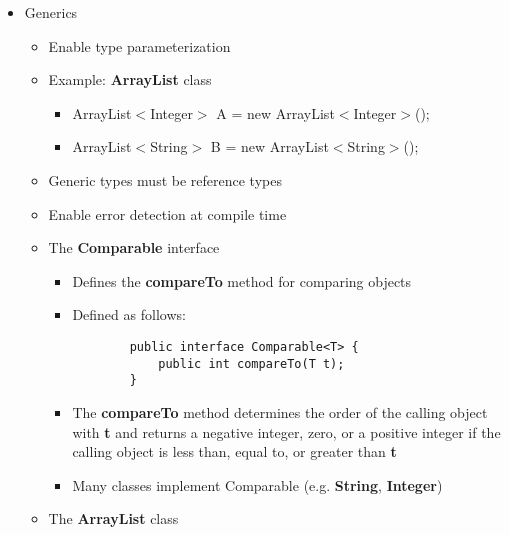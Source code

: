 \begin{itemize}
	\item Generics
	\begin{itemize}
		\item Enable type parameterization
		\item Example: \textbf{ArrayList} class
		\begin{itemize}
			\item ArrayList$<$Integer$>$ A = new ArrayList$<$Integer$>$();
			\item ArrayList$<$String$>$ B = new ArrayList$<$String$>$();
		\end{itemize}
		\item Generic types must be reference types
		\item Enable error detection at compile time
		\item The \textbf{Comparable} interface
		\begin{itemize}
			\item Defines the \textbf{compareTo} method for comparing objects
			\item Defined as follows:\begin{Verbatim}
		public interface Comparable<T> {
			public int compareTo(T t);
		}
				\end{Verbatim}
			\item The \textbf{compareTo} method determines the order of the calling object with \textbf{t} and returns a negative integer, zero, or a positive integer if the calling object is less than, equal to, or greater than \textbf{t}
			\item Many classes implement Comparable (e.g. \textbf{String}, \textbf{Integer})
		\end{itemize}
		\item The \textbf{ArrayList} class
		\begin{itemize}

\end{itemize}
\end{itemize}
\end{itemize}
